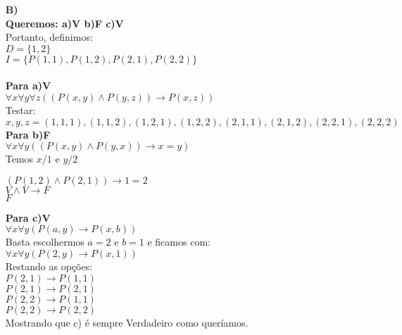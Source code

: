 \documentclass[12pt]{article}
\begin{document}
\begin{itemize}
\begin{itemize}
					\item[\textbf{B)}]
						\hfill\\
						\textbf{Queremos: a)V b)F c)V}\\
						Portanto, definimos:\\
						$D = \lbrace 1, 2 \rbrace$\\
						$I = \lbrace P(1, 1), P(1, 2), P(2, 1), P(2, 2)\rbrace$\\ \\
						\textbf{Para a)V}\\
						$\forall x \forall y \forall z ((P(x,y) \wedge P(y,z)) \rightarrow P(x, z))$\\
						Testar:\\
						$x, y, z = (1, 1, 1) , (1, 1, 2), (1, 2, 1), (1, 2, 2), (2, 1, 1),
						(2, 1, 2), (2, 2, 1), (2, 2, 2)$\\
						
						\textbf{Para b)F}\\
						$\forall x \forall y ((P(x,y) \wedge P(y,x)) \rightarrow x = y)$\\
						Temos $x/1$ e $y/2$\\
						\begin{center}
							$(P(1,2) \wedge P(2,1)) \rightarrow 1 = 2$\\
							$V \wedge V \rightarrow F$\\
							$F$
						\end{center}
						\newpage
						\textbf{Para c)V}\\
						$\forall x \forall y (P(a,y) \rightarrow P(x, b))$\\
						Basta escolhermos $a = 2$ e $b = 1$ e ficamos com:\\
						$\forall x \forall y (P(2,y) \rightarrow P(x, 1))$\\
						Restando as opções:\\
						$P(2,1) \rightarrow P(1, 1)$\\
						$P(2,1) \rightarrow P(2, 1)$\\
						$P(2,2) \rightarrow P(1, 1)$ \\
						$P(2,2) \rightarrow P(2, 2)$\\
						Mostrando que c) é sempre Verdadeiro como queríamos.
						

\end{itemize}
\end{itemize}
\end{document}
